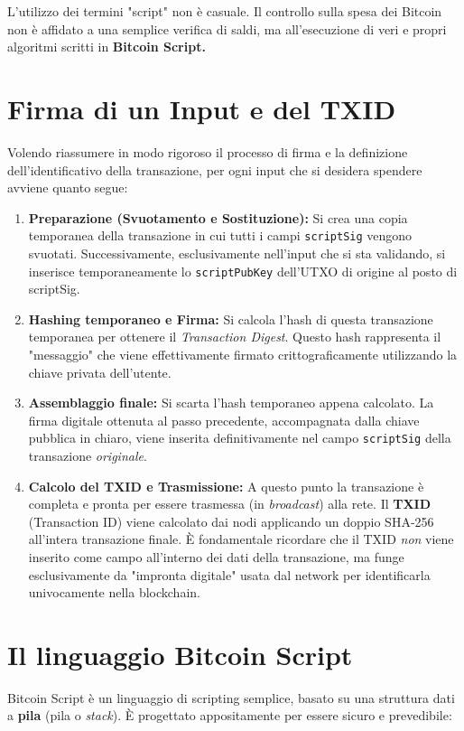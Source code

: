 L'utilizzo dei termini "script" non è casuale. Il controllo sulla spesa dei Bitcoin non è affidato a una semplice verifica di saldi, ma all'esecuzione di veri e propri algoritmi scritti in \textbf{Bitcoin Script.}

\section*{Firma di un Input e del TXID}

Volendo riassumere in modo rigoroso il processo di firma e la definizione dell'identificativo della transazione, per ogni input che si desidera spendere avviene quanto segue:
\begin{enumerate}
    \item \textbf{Preparazione (Svuotamento e Sostituzione):} Si crea una copia temporanea della transazione in cui tutti i campi \texttt{scriptSig} vengono svuotati. Successivamente, esclusivamente nell'input che si sta validando, si inserisce temporaneamente lo \texttt{scriptPubKey} dell'UTXO di origine al posto di scriptSig.
    \item \textbf{Hashing temporaneo e Firma:} Si calcola l'hash di questa transazione temporanea per ottenere il \textit{Transaction Digest}. Questo hash rappresenta il "messaggio" che viene effettivamente firmato crittograficamente utilizzando la chiave privata dell'utente.
    \item \textbf{Assemblaggio finale:} Si scarta l'hash temporaneo appena calcolato. La firma digitale ottenuta al passo precedente, accompagnata dalla chiave pubblica in chiaro, viene inserita definitivamente nel campo \texttt{scriptSig} della transazione \textit{originale}.
    \item \textbf{Calcolo del TXID e Trasmissione:} A questo punto la transazione è completa e pronta per essere trasmessa (in \textit{broadcast}) alla rete. Il \textbf{TXID} (Transaction ID) viene calcolato dai nodi applicando un doppio SHA-256 all'intera transazione finale. È fondamentale ricordare che il TXID \textit{non} viene inserito come campo all'interno dei dati della transazione, ma funge esclusivamente da "impronta digitale" usata dal network per identificarla univocamente nella blockchain.
\end{enumerate}

\section{Il linguaggio Bitcoin Script}
Bitcoin Script è un linguaggio di scripting semplice, basato su una struttura dati a \textbf{pila} (pila o \textit{stack}). È progettato appositamente per essere sicuro e prevedibile:

